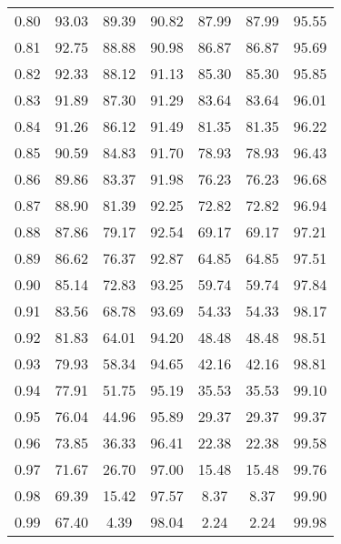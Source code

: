 \begin{tabular}{|c|c|c|c|c|c|c|}
      0.80 &     93.03 &     89.39 &      90.82 &   87.99 &      87.99 &         95.55 \\
      0.81 &     92.75 &     88.88 &      90.98 &   86.87 &      86.87 &         95.69 \\
      0.82 &     92.33 &     88.12 &      91.13 &   85.30 &      85.30 &         95.85 \\
      0.83 &     91.89 &     87.30 &      91.29 &   83.64 &      83.64 &         96.01 \\
      0.84 &     91.26 &     86.12 &      91.49 &   81.35 &      81.35 &         96.22 \\
      0.85 &     90.59 &     84.83 &      91.70 &   78.93 &      78.93 &         96.43 \\
      0.86 &     89.86 &     83.37 &      91.98 &   76.23 &      76.23 &         96.68 \\
      0.87 &     88.90 &     81.39 &      92.25 &   72.82 &      72.82 &         96.94 \\
      0.88 &     87.86 &     79.17 &      92.54 &   69.17 &      69.17 &         97.21 \\
      0.89 &     86.62 &     76.37 &      92.87 &   64.85 &      64.85 &         97.51 \\
      0.90 &     85.14 &     72.83 &      93.25 &   59.74 &      59.74 &         97.84 \\
      0.91 &     83.56 &     68.78 &      93.69 &   54.33 &      54.33 &         98.17 \\
      0.92 &     81.83 &     64.01 &      94.20 &   48.48 &      48.48 &         98.51 \\
      0.93 &     79.93 &     58.34 &      94.65 &   42.16 &      42.16 &         98.81 \\
      0.94 &     77.91 &     51.75 &      95.19 &   35.53 &      35.53 &         99.10 \\
      0.95 &     76.04 &     44.96 &      95.89 &   29.37 &      29.37 &         99.37 \\
      0.96 &     73.85 &     36.33 &      96.41 &   22.38 &      22.38 &         99.58 \\
      0.97 &     71.67 &     26.70 &      97.00 &   15.48 &      15.48 &         99.76 \\
      0.98 &     69.39 &     15.42 &      97.57 &    8.37 &       8.37 &         99.90 \\
      0.99 &     67.40 &      4.39 &      98.04 &    2.24 &       2.24 &         99.98 \\
\bottomrule
\end{tabular}
